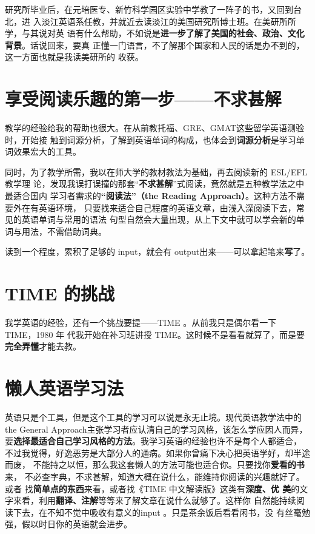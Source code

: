 研究所毕业后，在元培医专、新竹科学园区实验中学教了一阵子的书，又回到台北，进
入淡江英语系任教，并就近去读淡江的美国研究所博士班。在美研所所学，与其说对英
语有什么帮助，不如说是\textbf{进一步了解了美国的社会、政治、文化背景}。话说回来，要真
正懂一门语言，不了解那个国家和人民的话是办不到的，这一方面也就是我读美研所的
收获。

\section*{享受阅读乐趣的第一步——不求甚解}

教学的经验给我的帮助也很大。在从前教托福、GRE、GMAT这些留学英语测验时，开始接
触到词源分析，了解到英语单词的构成，也体会到\textbf{词源分析}是学习单词效果宏大的工具。

同时，为了教学所需，我以在师大学的教材教法为基础，再去阅读新的 ESL/EFL教学理
论，发现我误打误撞的那套“\textbf{不求甚解}”式阅读，竟然就是五种教学法之中最适合国内
学习者需求的\textbf{“阅读法”（the Reading Approach）}。这种方法不需要外在有英语环境，
只要找来适合自己程度的英语文章，由浅入深阅读下去，常见的英语单词与常用的语法
句型自然会大量出现，从上下文中就可以学会新的单词与用法，不需借助词典。

读到一个程度，累积了足够的 input，就会有 output出来——可以拿起笔来\textbf{写}了。

\section*{TIME 的挑战}

我学英语的经验，还有一个挑战要提——TIME 。从前我只是偶尔看一下 TIME，1980 年
代我开始在补习班讲授 TIME。这时候不是看看就算了，而是要\textbf{完全弄懂}才能去教。

\section*{懒人英语学习法}

英语只是个工具，但是这个工具的学习可以说是永无止境。现代英语教学法中的the
General Approach主张学习者应认清自己的学习风格，该怎么学应因人而异，
要\textbf{选择最适合自己学习风格的方法}。我学习英语的经验也许不是每个人都适合，
不过我觉得，好逸恶劳是大部分人的通病。如果你曾痛下决心把英语学好，却半途而废，
不能持之以恒，那么我这套懒人的方法可能也适合你。只要找你\textbf{爱看的书}来，
不必查字典，不求甚解，知道大概在说什么，能维持你阅读的兴趣就好了。或者
找\textbf{简单点的东西}来看，或者找《TIME 中文解读版》这类有\textbf{深度、优
  美}的文字来看，利用\textbf{翻译、注解}等等来了解文章在说什么就够了。这样你
自然能持续阅读下去，在不知不觉中吸收有意义的input 。只是茶余饭后看看闲书，没
有丝毫勉强，假以时日你的英语就会进步。



